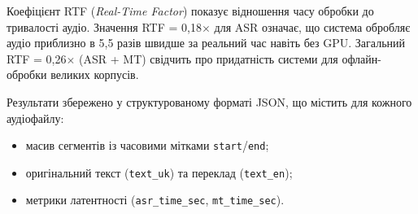 Коефіцієнт RTF (\textit{Real-Time Factor}) показує відношення часу обробки
до тривалості аудіо. Значення RTF = 0,18$\times$ для ASR означає, що система
обробляє аудіо приблизно в 5,5 разів швидше за реальний час навіть без GPU.
Загальний RTF = 0,26$\times$ (ASR + MT) свідчить про придатність системи
для офлайн-обробки великих корпусів.

Результати збережено у структурованому форматі JSON, що містить для кожного
аудіофайлу:
\begin{itemize}
    \item масив сегментів із часовими мітками \texttt{start}/\texttt{end};
    \item оригінальний текст (\texttt{text\_uk}) та переклад (\texttt{text\_en});
    \item метрики латентності (\texttt{asr\_time\_sec}, \texttt{mt\_time\_sec}).
\end{itemize}





\clearpage
